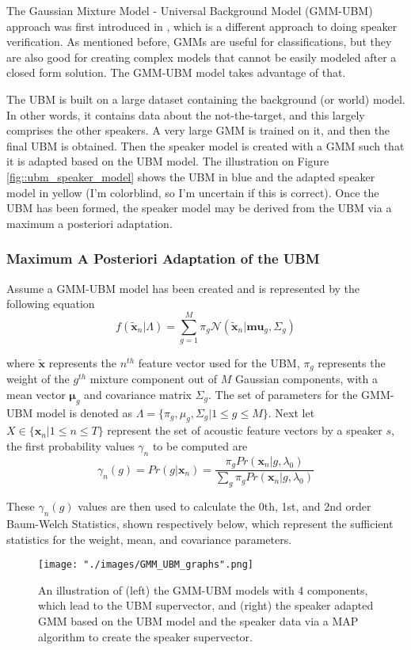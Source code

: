 The Gaussian Mixture Model - Universal Background Model (GMM-UBM) approach was first introduced in \cite{first_UBM}, which is a different approach to doing speaker verification. As mentioned before, GMMs are useful for classifications, but they are also good for creating complex models that cannot be easily modeled after a closed form solution. The GMM-UBM model takes advantage of that.

The UBM is built on a large dataset containing the background (or world) model. In other words, it contains data about the not-the-target, and this largely comprises the other speakers. A very large GMM is trained on it, and then the final UBM is obtained. Then the speaker model is created with a GMM such that it is adapted based on the UBM model. The illustration on Figure \ref{fig::ubm_speaker_model} shows the UBM in blue and the adapted speaker model in yellow (I'm colorblind, so I'm uncertain if this is correct). Once the UBM has been formed, the speaker model may be derived from the UBM via a maximum a posteriori adaptation.

\subsubsection*{Maximum A Posteriori Adaptation of the UBM}
Assume a GMM-UBM model has been created and is represented by the following equation
$$ f(\tilde{\bm{x}}_n | \Lambda) = \sum_{g = 1}^M \pi_g \mathcal{N} (\tilde{\bm{x}}_n | \bm{mu}_g, \Sigma_g)$$

where $\tilde{\bm{x}}$ represents the $n^{th}$ feature vector used for the UBM, $\pi_g$ represents the weight of the $g^{th}$ mixture component out of $M$ Gaussian components, with a mean vector $\bm{\mu}_g$ and covariance matrix $\Sigma_g$. The set of parameters for the GMM-UBM model is denoted as $\Lambda = \{ \pi_g, \mu_g, \Sigma_g | 1 \leq g \leq M \}$.
Next let $X \in \{ \bm{x}_n | 1 \leq n \leq T\}$ represent the set of acoustic feature vectors by a speaker $s$, the first probability values $\gamma_n$ to be computed are
$$\gamma_n (g) = Pr(g | \bm{x}_n) = \frac{\pi_g Pr(\bm{x}_n | g, \lambda_0)}{\sum_g \pi_g Pr(\bm{x}_n | g, \lambda_0)}$$

These $\gamma_n(g)$ values are then used to calculate the 0th, 1st, and 2nd order Baum-Welch Statistics, shown respectively below, which represent the sufficient statistics for the weight, mean, and covariance parameters.

\begin{figure}[h]
\begin{center}
    \texttt{[image: "./images/GMM\_UBM\_graphs".png]}
    \caption{An illustration of (left) the GMM-UBM models with 4 components, which lead to the UBM supervector, and (right) the speaker adapted GMM based on the UBM model and the speaker data via a MAP algorithm to create the speaker supervector.}
    \label{fig::ubm_speaker_graph}
\end{center}
\end{figure}

